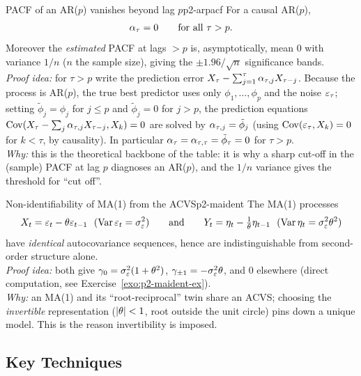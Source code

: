 \begin{proposition}{PACF of an AR($p$) vanishes beyond lag $p$}{p2-arpacf}
For a causal AR($p$),
\[
\alpha_\tau=0\qquad\text{for all }\tau>p .
\]
Moreover the \emph{estimated} PACF at lags $>p$ is, asymptotically, mean $0$
with variance $1/n$ ($n$ the sample size), giving the $\pm1.96/\sqrt n$
significance bands.\\
\textit{Proof idea:} for $\tau>p$ write the prediction error
$X_\tau-\sum_{j=1}^{\tau}\alpha_{\tau,j}X_{\tau-j}$. Because the process is
AR($p$), the true best predictor uses only $\phi_1,\dots,\phi_p$ and the noise
$\varepsilon_\tau$; setting $\tilde\phi_j=\phi_j$ for $j\le p$ and $\tilde\phi_j=0$ for
$j>p$, the prediction equations
$\operatorname{Cov}(X_\tau-\sum_j\alpha_{\tau,j}X_{\tau-j},X_k)=0$ are solved by
$\alpha_{\tau,j}=\tilde\phi_j$ (using $\operatorname{Cov}(\varepsilon_\tau,X_k)=0$ for $k<\tau$, by
causality). In particular $\alpha_\tau=\alpha_{\tau,\tau}=\tilde\phi_\tau=0$ for
$\tau>p$.\\
\textit{Why:} this is the theoretical backbone of the table: it is why a sharp
cut-off in the (sample) PACF at lag $p$ diagnoses an AR($p$), and the $1/n$
variance gives the threshold for ``cut off''.
\end{proposition}

\begin{proposition}{Non-identifiability of MA(1) from the ACVS}{p2-maident}
The MA(1) processes
\[
X_t=\eps_t-\theta\eps_{t-1}\ \ (\Var\eps_t=\sigma_\eps^2)
\qquad\text{and}\qquad
Y_t=\eta_t-\tfrac1\theta\eta_{t-1}\ \ (\Var\eta_t=\sigma_\eps^2\theta^2)
\]
have \emph{identical} autocovariance sequences, hence are indistinguishable from
second-order structure alone.\\
\textit{Proof idea:} both give
$\gamma_0=\sigma_\varepsilon^2(1+\theta^2)$, $\gamma_{\pm1}=-\sigma_\varepsilon^2\theta$, and $0$
elsewhere (direct computation, see Exercise~\ref{exo:p2-maident-ex}).\\
\textit{Why:} an MA(1) and its ``root-reciprocal'' twin share an ACVS; choosing
the \emph{invertible} representation ($\left\lvert \theta \right\rvert<1$, root outside the unit
circle) pins down a unique model. This is the reason invertibility is imposed.
\end{proposition}

\subsection{Key Techniques}

